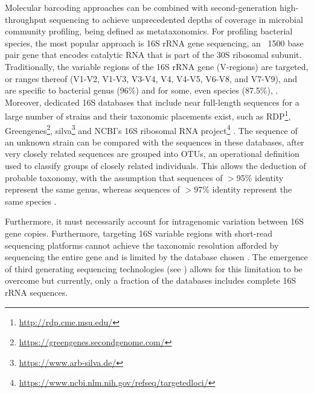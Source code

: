 Molecular barcoding approaches can be combined with second-generation high-throughput sequencing to achieve unprecedented depths of coverage in microbial community profiling, being defined as metataxonomics. 
For profiling bacterial species, the most popular approach is 16S \ac{rRNA} gene sequencing, an ~1500 base pair gene that encodes catalytic RNA that is part of the 30S ribosomal subunit. 
Traditionally, the variable regions of the 16S \ac{rRNA} gene (V-regions) are targeted, or ranges thereof (V1-V2, V1-V3, V3-V4, V4, V4-V5, V6-V8, and V7-V9), and are specific to bacterial genus (96\%) and for some, even species (87.5\%), \citep{srinivasan_use_2015, abellan-schneyder_primer_2021}. 
Moreover, dedicated 16S databases that include near full-length sequences for a large number of strains and their taxonomic placements exist, such as RDP\footnote{\url{http://rdp.cme.msu.edu/}}, Greengenes\footnote{\url{https://greengenes.secondgenome.com/}}, silva\footnote{\url{https://www.arb-silva.de/}} and NCBI's 16S ribosomal RNA project\footnote{\url{https://www.ncbi.nlm.nih.gov/refseq/targetedloci/}} \citep{cole_ribosomal_2009, desantis_greengenes_2006, pruesse_silva_2007}. 
The sequence of an unknown strain can be compared with the sequences in these databases, after very closely related sequences are grouped into \ac{OTUs},  an operational definition used to classify groups of closely related individuals. This allows the deduction of probable taxonomy, with the assumption that sequences of $>$95\% identity represent the same genus, whereas sequences of $>$97\% identity represent the same species \citep{schloss_introducing_2005}. 

Furthermore, it must necessarily account for intragenomic variation between 16S gene copies. 
Furthermore, targeting 16S variable regions with short-read sequencing platforms cannot achieve the taxonomic resolution afforded by sequencing the entire gene and is limited by the database chosen \citep{johnson_evaluation_2019}. 
The emergence of third generating sequencing technologies (see ) allows for this limitation to be overcome but currently, only a fraction of the databases includes complete 16S \ac{rRNA} sequences.


